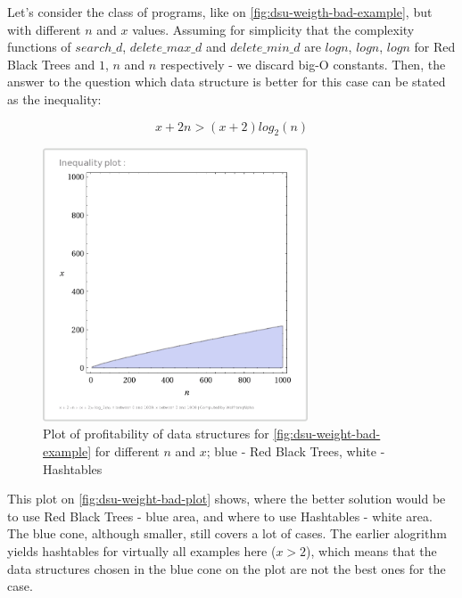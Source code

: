 \documentclass[a4paper,11pt]{article}
\begin{document}
            Let's consider the class of programs, like on \autoref{fig:dsu-weigth-bad-example}, but with different $n$
            and $x$ values. Assuming for simplicity that the complexity functions of $search\_d$, $delete\_max\_d$ and
            $delete\_min\_d$ are $log n$, $log n$, $log n$ for Red Black Trees and $1$, $n$ and $n$ respectively - we
            discard big-O constants. Then, the answer to the question which data structure is better for this case can
            be stated as the inequality:

            \begin{equation}
                x + 2n > (x + 2)log_2(n)
            \end{equation}

            \begin{figure}[!h]
                \begin{center}
                    \includegraphics[width=0.7\textwidth]{thesis-pics/dsu-weight-example.png}
                \end{center}

                \caption{Plot of profitability of data structures for \autoref{fig:dsu-weight-bad-example} for different
                $n$ and $x$; blue - Red Black Trees, white - Hashtables}

                \label{fig:dsu-weight-bad-plot}
            \end{figure}

            This plot on \autoref{fig:dsu-weight-bad-plot} shows, where the better solution would be to use Red Black
            Trees - blue area, and where to use Hashtables - white area. The blue cone, although smaller, still covers a
            lot of cases. The earlier alogrithm yields hashtables for virtually all examples here ($x > 2$), which means
            that the data structures chosen in the blue cone on the plot are not the best ones for the case.
\end{document}
